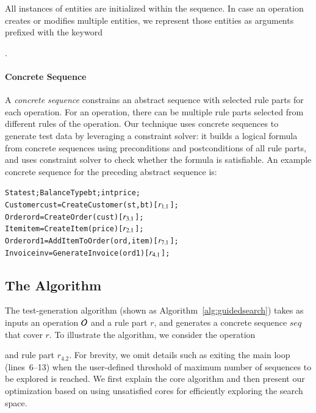 All instances of entities are initialized within the sequence.  In
case an operation creates or modifies multiple entities, we represent
those entities as arguments prefixed with the keyword \subject{out}.

\vskip -7pt
\paragraph*{Concrete Sequence} A \textit{concrete sequence} constrains an
abstract sequence with selected rule parts for each operation. For an operation,
there can be multiple rule parts selected from different rules of the
operation. Our technique uses concrete sequences to generate test data by
leveraging a constraint solver: it builds a logical formula from concrete
sequences using preconditions and postconditions of all rule parts, and uses
constraint solver to check whether the formula is satisfiable. An example
concrete sequence for the preceding abstract sequence is:

\vspace*{-4pt}
{\scriptsize
\begin{alltt} 
 State st; BalanceType bt; int price;
 Customer cust = CreateCustomer(st, bt) [\(r\sb{1.1}\)];
 Order ord = CreateOrder(cust) [\(r\sb{3.1}\)];	
 Item item = CreateItem(price) [\(r\sb{2.1}\)];
 Order ord1 = AddItemToOrder(ord, item) [\(r\sb{7.1}\)];
 Invoice inv = GenerateInvoice(ord1) [\(r\sb{4.1}\)];  
\end{alltt}
}
\vspace*{-5pt}

\subsection{The Algorithm}
\label{sec:technique}

The test-generation algorithm (shown as Algorithm~\ref{alg:guidedsearch}) takes
as inputs an operation ${\cal O}$ and a rule part $r$, and generates a concrete
sequence $seq$ that cover $r$. To illustrate the algorithm, we consider the
operation \subject{GenerateInvoice} and rule part $r_{4.2}$. For brevity, we
omit details such as exiting the main loop (lines~6--13) when the user-defined
threshold of maximum number of sequences to be explored is reached. We first
explain the core algorithm and then present our optimization based on using
unsatisfied cores for efficiently exploring the search space.

